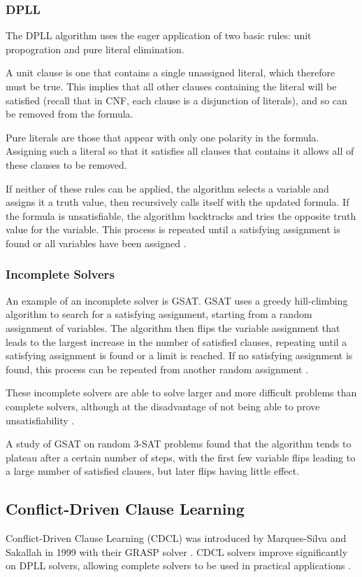 \documentclass[conference]{IEEEtran}
\begin{document}
\subsubsection{DPLL}
The DPLL algorithm uses the eager application of two basic rules: unit propogration and pure literal elimination.

A unit clause is one that contains a single unassigned literal, which therefore must be true. This implies that all other clauses containing the literal will be satisfied (recall that in CNF, each clause is a disjunction of literals), and so can be removed from the formula.

Pure literals are those that appear with only one polarity in the formula. Assigning such a literal so that it satisfies all clauses that contains it allows all of these clauses to be removed.

If neither of these rules can be applied, the algorithm selects a variable and assigns it a truth value, then recursively calls itself with the updated formula. If the formula is unsatisfiable, the algorithm backtracks and tries the opposite truth value for the variable. This process is repeated until a satisfying assignment is found or all variables have been assigned \cite{marques1999impact}.

\subsubsection{Incomplete Solvers}
An example of an incomplete solver is GSAT. GSAT uses a greedy hill-climbing algorithm to search for a satisfying assignment, starting from a random assignment of variables. The algorithm then flips the variable assignment that leads to the largest increase in the number of satisfied clauses, repeating until a satisfying assignment is found or a limit is reached. If no satisfying assignment is found, this process can be repeated from another random assignment \cite{gent1993empirical}.

These incomplete solvers are able to solve larger and more difficult problems than complete solvers, although at the disadvantage of not being able to prove unsatisfiability \cite{gent1993empirical}.

A study of GSAT on random 3-SAT problems found that the algorithm tends to plateau after a certain number of steps, with the first few variable flips leading to a large number of satisfied clauses, but later flips having little effect.

\subsection{Conflict-Driven Clause Learning}
Conflict-Driven Clause Learning (CDCL) was introduced by Marques-Silva and Sakallah in 1999 with their GRASP solver \cite{marques1999grasp}. CDCL solvers improve significantly on DPLL solvers, allowing complete solvers to be used in practical applications \cite{marques2008handbook}.
\end{document}
